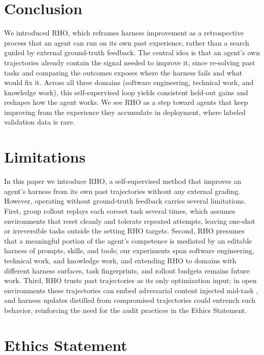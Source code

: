 \documentclass{llmxive}
\providecommand{\method}{\textsc{RHO}}
\begin{document}
\section{Conclusion}

We introduced \method{}, which reframes harness improvement as a retrospective process that an agent can run on its own past experience, rather than a search guided by external ground-truth feedback.
The central idea is that an agent's own trajectories already contain the signal needed to improve it, since re-solving past tasks and comparing the outcomes exposes where the harness fails and what would fix it.
Across all three domains (software engineering, technical work, and knowledge work), this self-supervised loop yields consistent held-out gains and reshapes how the agent works.
We see \method{} as a step toward agents that keep improving from the experience they accumulate in deployment, where labeled validation data is rare.


\section*{Limitations}

In this paper we introduce \method{}, a self-supervised method that improves an agent's harness from its own past trajectories without any external grading.
However, operating without ground-truth feedback carries several limitations.
First, group rollout replays each coreset task several times, which assumes environments that reset cleanly and tolerate repeated attempts, leaving one-shot or irreversible tasks outside the setting \method{} targets.
Second, \method{} presumes that a meaningful portion of the agent's competence is mediated by an editable harness of prompts, skills, and tools; our experiments span software engineering, technical work, and knowledge work, and extending \method{} to domains with different harness surfaces, task fingerprints, and rollout budgets remains future work.
Third, \method{} trusts past trajectories as its only optimization input; in open environments these trajectories can embed adversarial content injected mid-task \citep{liu2026webtrap}, and harness updates distilled from compromised trajectories could entrench such behavior, reinforcing the need for the audit practices in the Ethics Statement.

\section*{Ethics Statement}
\end{document}
